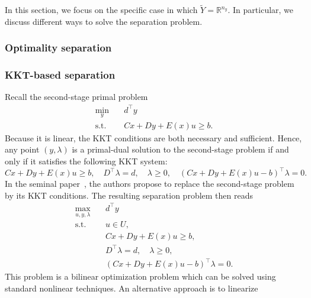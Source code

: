In this section, we focus on the specific case in which $\tilde{Y} =
\mathbb{R}^{n_y}$. In particular, we discuss different ways to solve the
separation problem. 

\subsubsection{Optimality separation}


\subsubsection*{KKT-based separation}

Recall the second-stage primal problem
\begin{subequations}
    \begin{align*}
        \min_{y} \quad & d^\top y \\
        \text{s.t.} \quad & Cx + Dy + E(x)u \ge b.
    \end{align*}
\end{subequations}
Because it is linear, the KKT conditions are both necessary and sufficient.
Hence, any point $(y,\lambda)$ is a primal-dual solution to the second-stage
problem if and only if it satisfies the following KKT system:
\begin{equation*}
    Cx + Dy + E(x)u \ge b, \quad 
    D^\top \lambda = d, \quad 
    \lambda\ge 0, \quad
    (Cx + Dy + E(x)u - b)^\top \lambda = 0.
\end{equation*}
In the seminal paper~\textcite{Zeng2013}, the authors propose to replace the
second-stage problem by its KKT conditions. The resulting separation problem
then reads 
\begin{subequations}
    \begin{align}
        \max_{u,y,\lambda} \quad & d^\top y \\
        \text{s.t.} \quad & u\in U, \\
        & Cx + Dy + E(x)u \ge b, \\ 
        & D^\top \lambda = d, \quad \lambda\ge 0, \\
        & (Cx + Dy + E(x)u - b)^\top \lambda = 0. \label{eq:ccg:kkt}
    \end{align}
\end{subequations}
This problem is a bilinear optimization problem which can be solved using
standard nonlinear techniques. An alternative approach is to linearize
